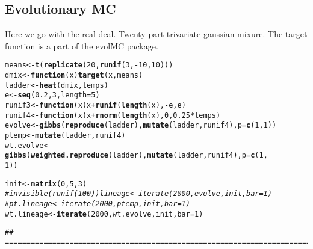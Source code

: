 \documentclass{article}\usepackage[]{graphicx}\usepackage[]{color}
\makeatletter
\newcommand{\hlnum}[1]{\textcolor[rgb]{0.686,0.059,0.569}{#1}}%
\newcommand{\hlcom}[1]{\textcolor[rgb]{0.678,0.584,0.686}{\textit{#1}}}%
\newcommand{\hlopt}[1]{\textcolor[rgb]{0,0,0}{#1}}%
\newcommand{\hlstd}[1]{\textcolor[rgb]{0.345,0.345,0.345}{#1}}%
\newcommand{\hlkwa}[1]{\textcolor[rgb]{0.161,0.373,0.58}{\textbf{#1}}}%
\newcommand{\hlkwb}[1]{\textcolor[rgb]{0.69,0.353,0.396}{#1}}%
\newcommand{\hlkwc}[1]{\textcolor[rgb]{0.333,0.667,0.333}{#1}}%
\newcommand{\hlkwd}[1]{\textcolor[rgb]{0.737,0.353,0.396}{\textbf{#1}}}%
\newenvironment{kframe}{%
 \def\at@end@of@kframe{}%
 \ifinner\ifhmode%
  \def\at@end@of@kframe{\end{minipage}}%
  \begin{minipage}{\columnwidth}%
 \fi\fi%
 \def\FrameCommand##1{\hskip\@totalleftmargin \hskip-\fboxsep
 \colorbox{shadecolor}{##1}\hskip-\fboxsep
     \hskip-\linewidth \hskip-\@totalleftmargin \hskip\columnwidth}%
 \MakeFramed {\advance\hsize-\width
   \@totalleftmargin\z@ \linewidth\hsize
   \@setminipage}}%
 {\par\unskip\endMakeFramed%
 \at@end@of@kframe}
\newenvironment{knitrout}{}{} %
\makeatother
\begin{document}
\subsection{Evolutionary MC}

Here we go with the real-deal. Twenty part trivariate-gaussian mixure.
The target function is a part of the evolMC package. 

\begin{knitrout}
\color{fgcolor}\begin{kframe}
\begin{alltt}
\hlstd{means} \hlkwb{<-} \hlkwd{t}\hlstd{(}\hlkwd{replicate}\hlstd{(}\hlnum{20}\hlstd{,} \hlkwd{runif}\hlstd{(}\hlnum{3}\hlstd{,} \hlopt{-}\hlnum{10}\hlstd{,} \hlnum{10}\hlstd{)))}
\hlstd{dmix} \hlkwb{<-} \hlkwa{function}\hlstd{(}\hlkwc{x}\hlstd{)} \hlkwd{target}\hlstd{(x, means)}
\hlstd{ladder} \hlkwb{<-} \hlkwd{heat}\hlstd{(dmix, temps)}
\hlstd{e} \hlkwb{<-} \hlkwd{seq}\hlstd{(}\hlnum{0.2}\hlstd{,} \hlnum{3}\hlstd{,} \hlkwc{length} \hlstd{=} \hlnum{5}\hlstd{)}
\hlstd{runif3} \hlkwb{<-} \hlkwa{function}\hlstd{(}\hlkwc{x}\hlstd{) x} \hlopt{+} \hlkwd{runif}\hlstd{(}\hlkwd{length}\hlstd{(x),} \hlopt{-}\hlstd{e, e)}
\hlstd{runif4} \hlkwb{<-} \hlkwa{function}\hlstd{(}\hlkwc{x}\hlstd{) x} \hlopt{+} \hlkwd{rnorm}\hlstd{(}\hlkwd{length}\hlstd{(x),} \hlnum{0}\hlstd{,} \hlnum{0.25} \hlopt{*} \hlstd{temps)}
\hlstd{evolve} \hlkwb{<-} \hlkwd{gibbs}\hlstd{(}\hlkwd{reproduce}\hlstd{(ladder),} \hlkwd{mutate}\hlstd{(ladder, runif4),} \hlkwc{p} \hlstd{=} \hlkwd{c}\hlstd{(}\hlnum{1}\hlstd{,} \hlnum{1}\hlstd{))}
\hlstd{ptemp} \hlkwb{<-} \hlkwd{mutate}\hlstd{(ladder, runif4)}
\hlstd{wt.evolve} \hlkwb{<-} \hlkwd{gibbs}\hlstd{(}\hlkwd{weighted.reproduce}\hlstd{(ladder),} \hlkwd{mutate}\hlstd{(ladder, runif4),} \hlkwc{p} \hlstd{=} \hlkwd{c}\hlstd{(}\hlnum{1}\hlstd{,}
    \hlnum{1}\hlstd{))}

\hlstd{init} \hlkwb{<-} \hlkwd{matrix}\hlstd{(}\hlnum{0}\hlstd{,} \hlnum{5}\hlstd{,} \hlnum{3}\hlstd{)}
\hlcom{# invisible(runif(100)) lineage <- iterate(2000, evolve, init, bar=1)}
\hlcom{# pt.lineage <- iterate(2000, ptemp, init, bar=1)}
\hlstd{wt.lineage} \hlkwb{<-} \hlkwd{iterate}\hlstd{(}\hlnum{2000}\hlstd{, wt.evolve, init,} \hlkwc{bar} \hlstd{=} \hlnum{1}\hlstd{)}
\end{alltt}
\begin{verbatim}
## ===========================================================================
\end{verbatim}
\end{kframe}
\end{knitrout}
\end{document}
